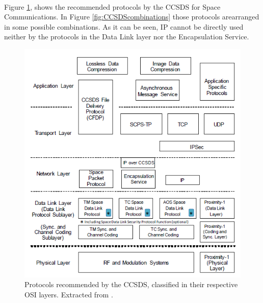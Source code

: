 \paragraph{}Figure \ref{fig:CCSDSprotocols}, shows the recommended protocols by the CCSDS for Space Communications. In Figure \ref{fig:CCSDScombinations} those protocols arearranged in some possible combinations. As it can be seen, IP cannot be directly used neither by the protocols in the Data Link layer nor the Encapsulation Service.
\begin{figure}[H]
\begin{center}
\includegraphics[scale=1]{CCSDSprotocols.PNG}
\caption[CCSDS Recommended Protocols]{Protocols recommended by the CCSDS, classified in their respective OSI layers. Extracted from \cite{CCSDSOverview}.}
\label{fig:CCSDSprotocols}
\end{center}
\end{figure}

